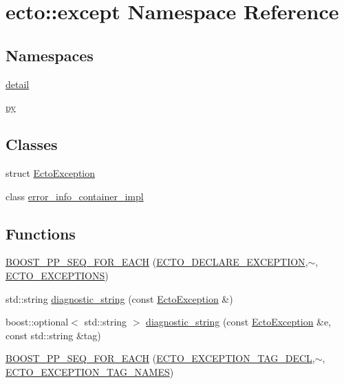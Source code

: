\hypertarget{namespaceecto_1_1except}{}\section{ecto\+:\+:except Namespace Reference}
\label{namespaceecto_1_1except}
\subsection*{Namespaces}
\begin{DoxyCompactItemize}
\item 
 \hyperlink{namespaceecto_1_1except_1_1detail}{detail}
\item 
 \hyperlink{namespaceecto_1_1except_1_1py}{py}
\end{DoxyCompactItemize}
\subsection*{Classes}
\begin{DoxyCompactItemize}
\item 
struct \hyperlink{structecto_1_1except_1_1EctoException}{Ecto\+Exception}
\item 
class \hyperlink{classecto_1_1except_1_1error__info__container__impl}{error\+\_\+info\+\_\+container\+\_\+impl}
\end{DoxyCompactItemize}
\subsection*{Functions}
\begin{DoxyCompactItemize}
\item 
\hyperlink{namespaceecto_1_1except_a6ed4b851e67551e870e933f85628cb6f}{B\+O\+O\+S\+T\+\_\+\+P\+P\+\_\+\+S\+E\+Q\+\_\+\+F\+O\+R\+\_\+\+E\+A\+CH} (\hyperlink{except_8hpp_a9b77695b9c45c36934e7c890ce6f682f}{E\+C\+T\+O\+\_\+\+D\+E\+C\+L\+A\+R\+E\+\_\+\+E\+X\+C\+E\+P\+T\+I\+ON},$\sim$, \hyperlink{except_8hpp_ad3bbab1baffa25e20db0635270c5f108}{E\+C\+T\+O\+\_\+\+E\+X\+C\+E\+P\+T\+I\+O\+NS})
\item 
std\+::string \hyperlink{namespaceecto_1_1except_a8161938bf962eaf02d9b0e73b80a5c4a}{diagnostic\+\_\+string} (const \hyperlink{structecto_1_1except_1_1EctoException}{Ecto\+Exception} \&)
\item 
boost\+::optional$<$ std\+::string $>$ \hyperlink{namespaceecto_1_1except_abebe710f45e8d06b2df19d02bf15b193}{diagnostic\+\_\+string} (const \hyperlink{structecto_1_1except_1_1EctoException}{Ecto\+Exception} \&e, const std\+::string \&tag)
\item 
\hyperlink{namespaceecto_1_1except_a8744cfe3c8d4364696873aeb175c68b9}{B\+O\+O\+S\+T\+\_\+\+P\+P\+\_\+\+S\+E\+Q\+\_\+\+F\+O\+R\+\_\+\+E\+A\+CH} (\hyperlink{except_8hpp_a4a4f231e4fe0f923cd9ee3a48803ca30}{E\+C\+T\+O\+\_\+\+E\+X\+C\+E\+P\+T\+I\+O\+N\+\_\+\+T\+A\+G\+\_\+\+D\+E\+CL},$\sim$, \hyperlink{except_8hpp_a6a632b3827deba566cbca48b37bf53e2}{E\+C\+T\+O\+\_\+\+E\+X\+C\+E\+P\+T\+I\+O\+N\+\_\+\+T\+A\+G\+\_\+\+N\+A\+M\+ES})
\end{DoxyCompactItemize}



